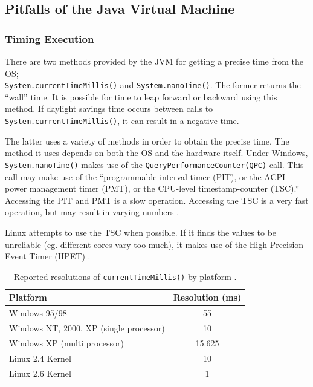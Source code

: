 \documentclass[12pt,letterpaper,oneside]{report}
\theoremstyle{definition}
\begin{document}
			\subsection{Pitfalls of the Java Virtual Machine}
				\subsubsection{Timing Execution}
					There are two methods provided by the JVM for getting a precise time from the OS; \\\texttt{System.currentTimeMillis()} and \texttt{System.nanoTime()}.  The former returns the ``wall'' time.  It is possible for time to leap forward or backward using this method.  If daylight savings time occurs between calls to \texttt{System.currentTimeMillis()}, it can result in a negative time.
					
					The latter uses a variety of methods in order to obtain the precise time.  The method it uses depends on both the OS and the hardware itself.  Under Windows, \texttt{System.nanoTime()} makes use of the \texttt{QueryPerformanceCounter(QPC)} call.  This call may make use of the ``programmable-interval-timer (PIT), or the ACPI power management timer (PMT), or the CPU-level timestamp-counter (TSC).'' \cite{hotspot-timer-06}  Accessing the PIT and PMT is a slow operation.  Accessing the TSC is a very fast operation, but may result in varying numbers \cite{linux-tsc-06}.
					
					Linux attempts to use the TSC when possible.  If it finds the values to be unreliable (eg. different cores vary too much), it makes use of the High Precision Event Timer (HPET) \cite{linux-tsc-06}.
					
					\begin{table}[!ht]
						\centering
						\begin{tabular}{lc}
							\toprule
							Platform & Resolution (ms) \\
							\midrule
							Windows 95/98 & 55 \\
							Windows NT, 2000, XP (single processor) & 10 \\
							Windows XP (multi processor) & 15.625 \\
							Linux 2.4 Kernel & 10 \\
							Linux 2.6 Kernel & 1 \\
							\bottomrule
						\end{tabular}
						\caption{Reported resolutions of \texttt{currentTimeMillis()} by platform \cite{rob-java-bench-08}.}
					\end{table}
					
\end{document}
